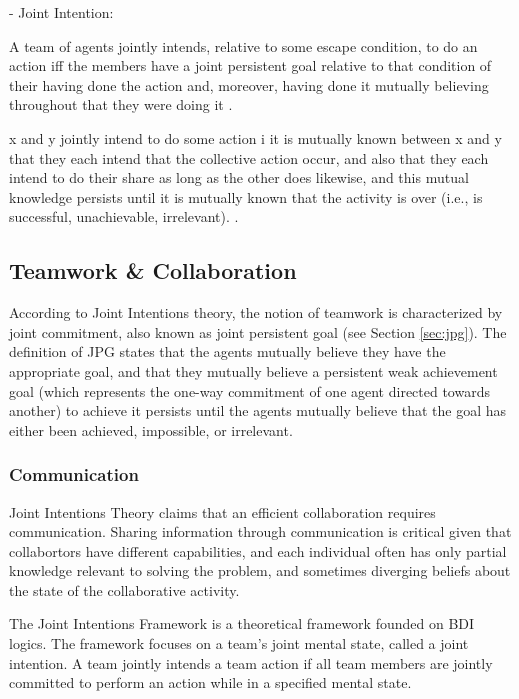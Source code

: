 \documentclass[11pt]{article}
\begin{document}
- Joint Intention:

A team of agents jointly intends, relative to some escape condition, to do an
action iff the members have a joint persistent goal relative to that condition
of their having done the action and, moreover, having done it mutually believing
throughout that they were doing it \cite{cohen:teamwork}.

x and y jointly intend to do some action i it is mutually known between x and y
that they each intend that the collective action occur, and also that they each
intend to do their share as long as the other does likewise, and this mutual
knowledge persists until it is mutually known that the activity is over (i.e.,
is successful, unachievable, irrelevant). \cite{cohen:team-formation}.



\subsection{Teamwork \& Collaboration}

According to Joint Intentions theory, the notion of teamwork is characterized by
joint commitment, also known as joint persistent goal (see Section
\ref{sec:jpg}). The definition of JPG states that the agents mutually believe
they have the appropriate goal, and that they mutually believe a persistent weak
achievement goal (which represents the one-way commitment of one agent directed
towards another) to achieve it persists until the agents mutually believe that
the goal has either been achieved, impossible, or irrelevant.

\subsubsection{Communication}

Joint Intentions Theory claims that an efficient collaboration requires
communication. Sharing information through communication is critical given that
collabortors have different capabilities, and each individual often has only
partial knowledge relevant to solving the problem, and sometimes diverging
beliefs about the state of the collaborative activity.




The Joint Intentions Framework \cite{levesque:acting-together}
\cite{cohen:intention-commitment} \cite{cohen:persistence-intention-commitment}
is a theoretical framework founded on BDI logics. The framework focuses on a
team's joint mental state, called a joint intention. A team jointly intends a
team action if all team members are jointly committed to perform an action while
in a specified mental state.
\end{document}
